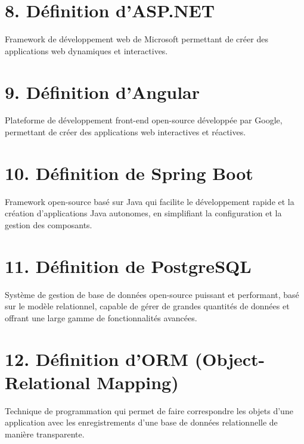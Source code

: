 \documentclass[a4paper, 11pt]{report}
\begin{document}
\section*{8. Définition d'ASP.NET}
Framework de développement web de Microsoft permettant de créer des applications web dynamiques et interactives.

\section*{9. Définition d'Angular}
Plateforme de développement front-end open-source développée par Google, permettant de créer des applications web interactives et réactives.

\section*{10. Définition de Spring Boot}
Framework open-source basé sur Java qui facilite le développement rapide et la création d'applications Java autonomes, en simplifiant la configuration et la gestion des composants.

\section*{11. Définition de PostgreSQL}
Système de gestion de base de données open-source puissant et performant, basé sur le modèle relationnel, capable de gérer de grandes quantités de données et offrant une large gamme de fonctionnalités avancées.

\section*{12. Définition d'ORM (Object-Relational Mapping)}
Technique de programmation qui permet de faire correspondre les objets d'une application avec les enregistrements d'une base de données relationnelle de manière transparente.
\end{document}
